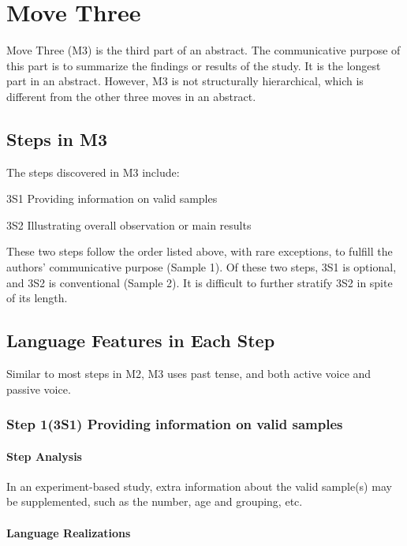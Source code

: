 \documentclass{ctexbook}
\begin{document}
\chapter{Move Three}\label{chapter5}

Move Three (M3) is the third part of an abstract. The communicative purpose of this part is to summarize the findings or results of the study. It is the longest part in an abstract. However, M3 is not structurally hierarchical, which is different from the other three moves in an abstract.

\section{Steps in M3}

The steps discovered in M3 include:

3S1 Providing information on valid samples

3S2 Illustrating overall observation or main results 

These two steps follow the order listed above, with rare exceptions, to fulfill the authors' communicative purpose (Sample 1). Of these two steps, 3S1 is optional, and 3S2 is conventional (Sample 2). It is difficult to further stratify 3S2 in spite of its length.

\section{Language Features in Each Step}

Similar to most steps in M2, M3 uses past tense, and both active voice and passive voice.

  \subsection{Step 1(3S1) Providing information on valid samples}
    \subsubsection{Step Analysis}

    In an experiment-based study, extra information about the valid sample(s) may be supplemented, such as the number, age and grouping, etc.

    \subsubsection{Language Realizations}
\end{document}
